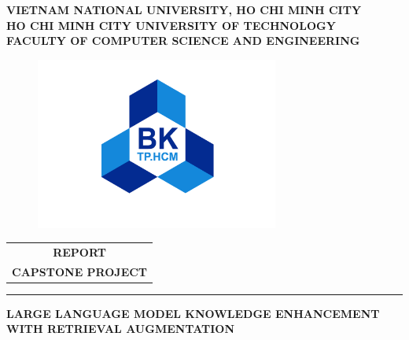 \documentclass[a4paper]{report}
\begin{document}
\begin{titlepage}
\vspace{-2.cm}
\begin{center}
\large \textbf{\fontsize{14pt}{0pt}\selectfont VIETNAM NATIONAL UNIVERSITY, HO CHI MINH CITY} \\
\Large \textbf{\fontsize{14pt}{0pt}\selectfont HO CHI MINH CITY UNIVERSITY OF TECHNOLOGY} \\
\Large \textbf{\fontsize{14pt}{0pt}\selectfont FACULTY OF COMPUTER SCIENCE AND ENGINEERING}
\end{center}

\vspace{0.3cm}

\begin{figure}[h!]
\begin{center}
\includegraphics[width=8cm]{image/hcmut.png}
\end{center}
\end{figure}
\vspace{-1cm}
\begin{center}
\begin{tabular}{c}
\multicolumn{1}{c}{\textbf{{\Large REPORT}}}
\\{\textbf{{\Large \MakeUppercase{CAPSTONE PROJECT}}}}
\\

\end{tabular}
\end{center}
\rule[0.4cm]{\linewidth}{0.3mm} 
\centering
{\Large \bfseries \MakeUppercase{Large Language Model Knowledge Enhancement With Retrieval Augmentation}}    


\end{titlepage}
\end{document}
